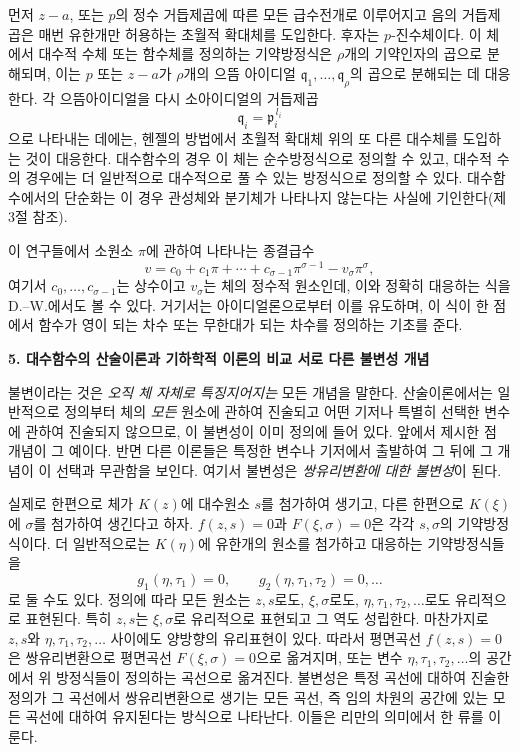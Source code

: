 먼저 \(z-a\), 또는 \(p\)의 정수 거듭제곱에 따른 모든 급수전개로 이루어지고 음의 거듭제곱은 매번 유한개만 허용하는 초월적 확대체를 도입한다. 후자는 \(p\)-진수체이다. 이 체에서 대수적 수체 또는 함수체를 정의하는 기약방정식은 \(\rho\)개의 기약인자의 곱으로 분해되며, 이는 \(p\) 또는 \(z-a\)가 \(\rho\)개의 \glqq{}으뜸\grqq{} 아이디얼 \(\mathfrak q_1,\ldots,\mathfrak q_\rho\)의 곱으로 분해되는 데 대응한다. 각 으뜸아이디얼을 다시 소아이디얼의 거듭제곱
\[
\mathfrak q_i=\mathfrak p_i^{\,l_i}
\]
으로 나타내는 데에는, 헨젤의 방법에서 초월적 확대체 위의 또 다른 대수체를 도입하는 것이 대응한다. 대수함수의 경우 이 체는 순수방정식으로 정의할 수 있고, 대수적 수의 경우에는 더 일반적으로 대수적으로 풀 수 있는 방정식으로 정의할 수 있다. 대수함수에서의 단순화는 이 경우 관성체와 분기체가 나타나지 않는다는 사실에 기인한다(제3절 참조).

이 연구들에서 소원소 \(\pi\)에 관하여 나타나는 \glqq{}종결급수\grqq{}
\[
v=c_0+c_1\pi+\cdots+c_{\sigma-1}\pi^{\sigma-1}-v_\sigma\pi^\sigma,
\]
여기서 \(c_0,\ldots,c_{\sigma-1}\)는 상수이고 \(v_\sigma\)는 체의 정수적 원소인데, 이와 정확히 대응하는 식을 D.--W.에서도 볼 수 있다. 거기서는 아이디얼론으로부터 이를 유도하며, 이 식이 한 점에서 함수가 영이 되는 차수 또는 무한대가 되는 차수를 정의하는 기초를 준다.

\begin{center}
\textbf{5. 대수함수의 산술이론과 기하학적 이론의 비교\newline
서로 다른 불변성 개념}
\end{center}

\glqq{}불변\grqq{}이라는 것은 \emph{오직 체 자체로 특징지어지는} 모든 개념을 말한다. 산술이론에서는 일반적으로 정의부터 체의 \emph{모든} 원소에 관하여 진술되고 어떤 기저나 특별히 선택한 변수에 관하여 진술되지 않으므로, 이 불변성이 이미 정의에 들어 있다. 앞에서 제시한 점 개념이 그 예이다. 반면 다른 이론들은 특정한 변수나 기저에서 출발하여 그 뒤에 그 개념이 이 선택과 무관함을 보인다. 여기서 불변성은 \emph{쌍유리변환에 대한 불변성}이 된다.

실제로 한편으로 체가 \(K(z)\)에 대수원소 \(s\)를 첨가하여 생기고, 다른 한편으로 \(K(\xi)\)에 \(\sigma\)를 첨가하여 생긴다고 하자. \(f(z,s)=0\)과 \(F(\xi,\sigma)=0\)은 각각 \(s,\sigma\)의 기약방정식이다. 더 일반적으로는 \(K(\eta)\)에 유한개의 원소를 첨가하고 대응하는 기약방정식들을
\[
g_1(\eta,\tau_1)=0,\qquad
g_2(\eta,\tau_1,\tau_2)=0,\ldots
\]
로 둘 수도 있다. 정의에 따라 모든 원소는 \(z,s\)로도, \(\xi,\sigma\)로도, \(\eta,\tau_1,\tau_2,\ldots\)로도 유리적으로 표현된다. 특히 \(z,s\)는 \(\xi,\sigma\)로 유리적으로 표현되고 그 역도 성립한다. 마찬가지로 \(z,s\)와 \(\eta,\tau_1,\tau_2,\ldots\) 사이에도 양방향의 유리표현이 있다. 따라서 평면곡선 \(f(z,s)=0\)은 \glqq{}쌍유리변환\grqq{}으로 평면곡선 \(F(\xi,\sigma)=0\)으로 옮겨지며, 또는 변수 \(\eta,\tau_1,\tau_2,\ldots\)의 공간에서 위 방정식들이 정의하는 곡선으로 옮겨진다. 불변성은 특정 곡선에 대하여 진술한 정의가 그 곡선에서 쌍유리변환으로 생기는 모든 곡선, 즉 임의 차원의 공간에 있는 모든 곡선에 대하여 유지된다는 방식으로 나타난다. 이들은 리만의 의미에서 한 \glqq{}류\grqq{}를 이룬다.

